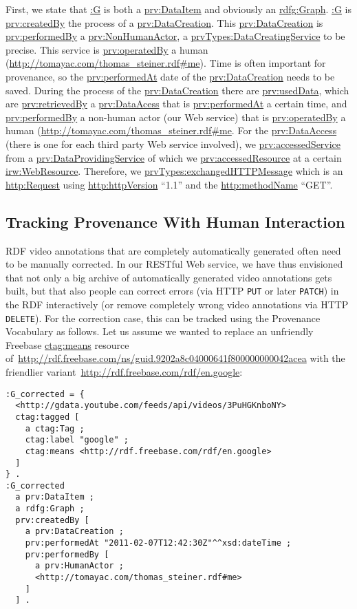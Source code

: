 \documentclass{acm_proc_article-sp}
\newcommand{\nofootnote}[1]{~#1}
\begin{document}
First, we state that \url{:G} is both a \url{prv:DataItem} and obviously an \url{rdfg:Graph}. \url{:G} is
\url{prv:createdBy} the process of a \url{prv:DataCreation}. This \url{prv:DataCreation} is \url{prv:performedBy} a
\url{prv:NonHumanActor}, a \url{prvTypes:DataCreatingService} to be precise. This service is \url{prv:operatedBy} a
human (\url{http://tomayac.com/thomas_steiner.rdf#me}). Time is often important for provenance, so the
\url{prv:performedAt} date of the \url{prv:DataCreation} needs to be saved. During the process of the
\url{prv:DataCreation} there are \url{prv:usedData}, which are \url{prv:retrievedBy} a \url{prv:DataAcess} that is
\url{prv:performedAt} a certain time, and \url{prv:performedBy} a non-human actor (our Web service) that is
\url{prv:operatedBy} a human (\url{http://tomayac.com/thomas_steiner.rdf#me}. For the \url{prv:DataAccess} (there is
one for each third party Web service involved), we \url{prv:accessedService} from a \url{prv:DataProvidingService} of
which we \url{prv:accessedResource} at a certain \url{irw:WebResource}. Therefore, we
\url{prvTypes:exchangedHTTPMessage} which is an \url{http:Request} using \url{http:httpVersion} ``1.1'' and the
\url{http:methodName} ``GET''.

\subsection{Tracking Provenance With Human Interaction}                     \label{sec:human}
RDF video annotations that are completely automatically generated often need to be manually corrected. In our RESTful
Web service, we have thus envisioned that not only a big archive of automatically generated video annotations gets
built, but that also people can correct errors (via HTTP \texttt{PUT} or later \texttt{PATCH}) in the RDF interactively
(or remove completely wrong video annotations via HTTP \texttt{DELETE}). For the correction case, this can be tracked
using the Provenance Vocabulary as follows. Let us assume we wanted to replace an unfriendly Freebase \url{ctag:means}
resource of\nofootnote{\url{http://rdf.freebase.com/ns/guid.9202a8c04000641f800000000042acea}} with the friendlier
variant\nofootnote{\url{http://rdf.freebase.com/rdf/en.google}}:
\begin{lstlisting}
:G_corrected = {
  <http://gdata.youtube.com/feeds/api/videos/3PuHGKnboNY>
  ctag:tagged [
    a ctag:Tag ;
    ctag:label "google" ;
    ctag:means <http://rdf.freebase.com/rdf/en.google>
  ]
} .
:G_corrected
  a prv:DataItem ;
  a rdfg:Graph ;
  prv:createdBy [
    a prv:DataCreation ;
    prv:performedAt "2011-02-07T12:42:30Z"^^xsd:dateTime ;
    prv:performedBy [
      a prv:HumanActor ;
      <http://tomayac.com/thomas_steiner.rdf#me>
    ]
  ] .
\end{lstlisting}
\end{document}
